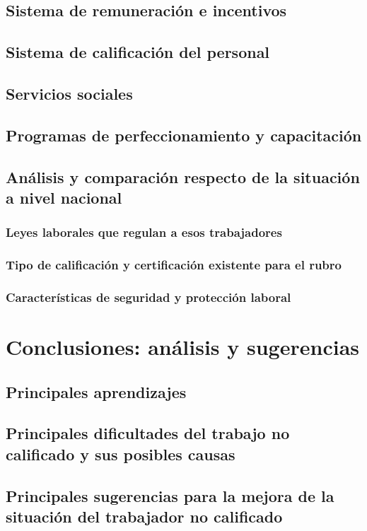 \subsection{Sistema de remuneración e incentivos}
\subsection{Sistema de calificación del personal}
\subsection{Servicios sociales}
\subsection{Programas de perfeccionamiento y capacitación}
\subsection{Análisis y comparación respecto de la situación a nivel nacional}
\subsubsection{Leyes laborales que regulan a esos trabajadores}
\subsubsection{Tipo de calificación y certificación existente para el rubro}
\subsubsection{Características de seguridad y protección laboral}

\section{Conclusiones: análisis y sugerencias}
\subsection{Principales aprendizajes}
\subsection{Principales dificultades del trabajo no calificado y sus posibles causas}
\subsection{Principales sugerencias para la mejora de la situación del trabajador no calificado}
